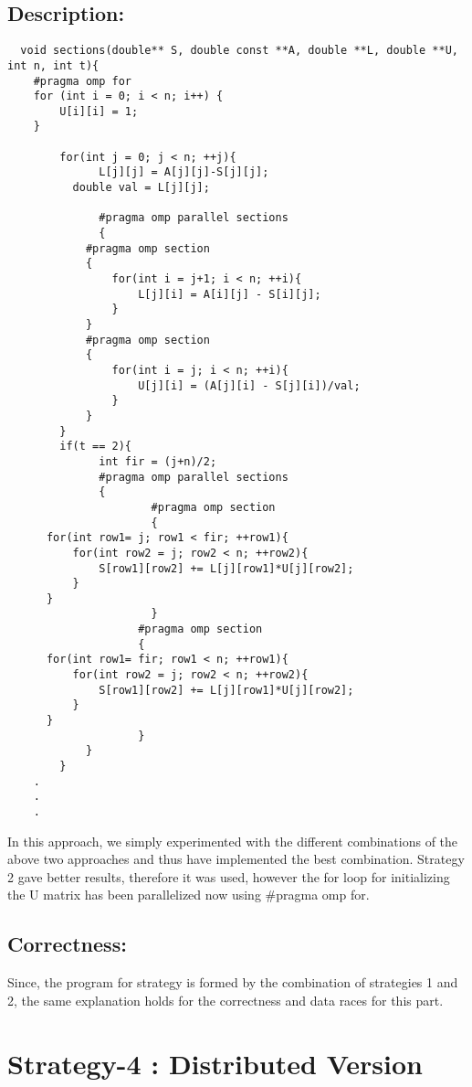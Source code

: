 \documentclass[12pt]{article}
\begin{document}
\subsection*{Description:}

\begin{verbatim}
  void sections(double** S, double const **A, double **L, double **U, int n, int t){
    #pragma omp for
    for (int i = 0; i < n; i++) {
        U[i][i] = 1;
    }

	    for(int j = 0; j < n; ++j){
		      L[j][j] = A[j][j]-S[j][j];
          double val = L[j][j];
          
		      #pragma omp parallel sections
		      {
            #pragma omp section
            {
                for(int i = j+1; i < n; ++i){
                    L[j][i] = A[i][j] - S[i][j];
                }
            }
            #pragma omp section
            {
                for(int i = j; i < n; ++i){
                    U[j][i] = (A[j][i] - S[j][i])/val;
                }
            }
		}
		if(t == 2){
			  int fir = (j+n)/2;
			  #pragma omp parallel sections
			  {
					  #pragma omp section
					  {
      for(int row1= j; row1 < fir; ++row1){
          for(int row2 = j; row2 < n; ++row2){
              S[row1][row2] += L[j][row1]*U[j][row2];
          }
      }
					  }
					#pragma omp section
					{
      for(int row1= fir; row1 < n; ++row1){
          for(int row2 = j; row2 < n; ++row2){
              S[row1][row2] += L[j][row1]*U[j][row2];
          }
      }
					}
			}
		}
    .
    .
    .
\end{verbatim}


In this approach, we simply experimented with the different combinations of the above two approaches
and thus have implemented the best combination. Strategy 2 gave better results, therefore it was used, however the for loop for initializing the U matrix has been parallelized now using \#pragma omp for.

\subsection*{Correctness:}

Since, the program for strategy is formed by the combination of strategies 1 and 2, the same explanation holds for the correctness and data races for this part.

\newpage

\section*{Strategy-4 : Distributed Version}
\end{document}
